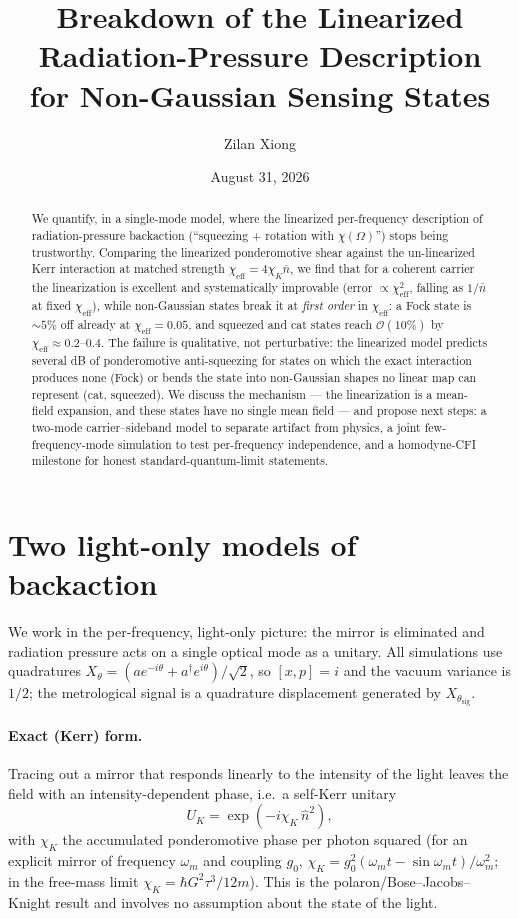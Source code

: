 \documentclass[11pt]{article}
\title{Breakdown of the Linearized Radiation-Pressure Description\\
       for Non-Gaussian Sensing States}
\author{Zilan Xiong}
\date{August 31, 2026}
\newcommand{\nbar}{\bar{n}}
\newcommand{\chieff}{\chi_{\mathrm{eff}}}
\newcommand{\chiK}{\chi_{K}}
\begin{document}
\maketitle

\begin{abstract}
We quantify, in a single-mode model, where the linearized per-frequency
description of radiation-pressure backaction (``squeezing + rotation with
$\chi(\Omega)$'') stops being trustworthy. Comparing the linearized
ponderomotive shear against the un-linearized Kerr interaction at matched
strength $\chieff = 4\chiK\nbar$, we find that for a coherent carrier the
linearization is excellent and systematically improvable (error
$\propto \chieff^{2}$, falling as $1/\nbar$ at fixed $\chieff$), while
non-Gaussian states break it at \emph{first order} in $\chieff$: a Fock
state is $\sim 5\%$ off already at $\chieff = 0.05$, and squeezed and cat
states reach $\mathcal{O}(10\%)$ by $\chieff \approx 0.2$--$0.4$. The
failure is qualitative, not perturbative: the linearized model predicts
several dB of ponderomotive anti-squeezing for states on which the exact
interaction produces none (Fock) or bends the state into non-Gaussian
shapes no linear map can represent (cat, squeezed). We discuss the
mechanism --- the linearization is a mean-field expansion, and these states
have no single mean field --- and propose next steps: a two-mode
carrier--sideband model to separate artifact from physics, a joint
few-frequency-mode simulation to test per-frequency independence, and a
homodyne-CFI milestone for honest standard-quantum-limit statements.
\end{abstract}

\section{Two light-only models of backaction}

We work in the per-frequency, light-only picture: the mirror is eliminated
and radiation pressure acts on a single optical mode as a unitary. All
simulations use quadratures $X_\theta = (a e^{-i\theta} + a^\dagger
e^{i\theta})/\sqrt{2}$, so $[x, p] = i$ and the vacuum variance is $1/2$;
the metrological signal is a quadrature displacement generated by
$X_{\theta_{\mathrm{sig}}}$.

\paragraph{Exact (Kerr) form.} Tracing out a mirror that responds linearly
to the intensity of the light leaves the field with an
intensity-dependent phase, i.e.\ a self-Kerr unitary
\begin{equation}
  U_K = \exp\!\left(-i \chiK\, \hat{n}^{2}\right),
  \label{eq:kerr}
\end{equation}
with $\chiK$ the accumulated ponderomotive phase per photon squared
(for an explicit mirror of frequency $\omega_m$ and coupling $g_0$,
$\chiK = g_0^{2}(\omega_m t - \sin\omega_m t)/\omega_m^{2}$; in the
free-mass limit $\chiK = \hbar G^{2}\tau^{3}/12m$). This is the
polaron/Bose--Jacobs--Knight result and involves no assumption about the
state of the light.
\end{document}
